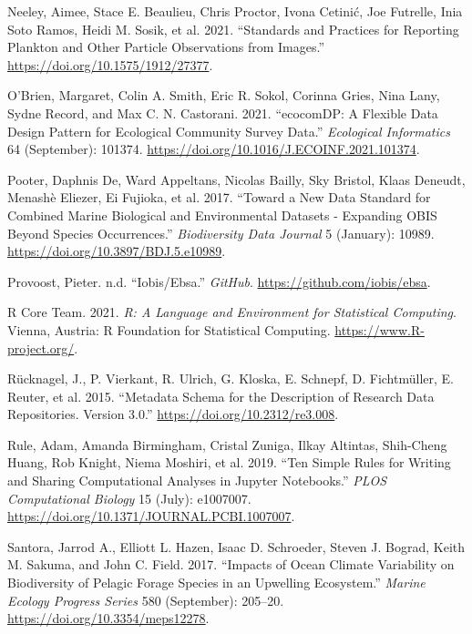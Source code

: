 \documentclass[
]{book}
\newlength{\cslhangindent}
\newlength{\cslentryspacingunit} %
\newenvironment{CSLReferences}[2] %
 {%
  \setlength{\parindent}{0pt}
  \ifodd #1
  \let\oldpar\par
  \def\par{\hangindent=\cslhangindent\oldpar}
  \fi
  \setlength{\parskip}{#2\cslentryspacingunit}
 }%
 {}
\begin{document}
\begin{CSLReferences}{1}{0}
\leavevmode{}%
Neeley, Aimee, Stace E. Beaulieu, Chris Proctor, Ivona Cetinić, Joe Futrelle, Inia Soto Ramos, Heidi M. Sosik, et al. 2021. {``Standards and Practices for Reporting Plankton and Other Particle Observations from Images.''} \url{https://doi.org/10.1575/1912/27377}.

\leavevmode{}%
O'Brien, Margaret, Colin A. Smith, Eric R. Sokol, Corinna Gries, Nina Lany, Sydne Record, and Max C. N. Castorani. 2021. {``ecocomDP: A Flexible Data Design Pattern for Ecological Community Survey Data.''} \emph{Ecological Informatics} 64 (September): 101374. \url{https://doi.org/10.1016/J.ECOINF.2021.101374}.

\leavevmode{}%
Pooter, Daphnis De, Ward Appeltans, Nicolas Bailly, Sky Bristol, Klaas Deneudt, Menashè Eliezer, Ei Fujioka, et al. 2017. {``Toward a New Data Standard for Combined Marine Biological and Environmental Datasets - Expanding OBIS Beyond Species Occurrences.''} \emph{Biodiversity Data Journal} 5 (January): 10989. \url{https://doi.org/10.3897/BDJ.5.e10989}.

\leavevmode{}%
Provoost, Pieter. n.d. {``Iobis/Ebsa.''} \emph{GitHub}. \url{https://github.com/iobis/ebsa}.

\leavevmode{}%
R Core Team. 2021. \emph{R: A Language and Environment for Statistical Computing}. Vienna, Austria: R Foundation for Statistical Computing. \url{https://www.R-project.org/}.

\leavevmode{}%
Rücknagel, J., P. Vierkant, R. Ulrich, G. Kloska, E. Schnepf, D. Fichtmüller, E. Reuter, et al. 2015. {``Metadata Schema for the Description of Research Data Repositories. Version 3.0.''} \url{https://doi.org/10.2312/re3.008}.

\leavevmode{}%
Rule, Adam, Amanda Birmingham, Cristal Zuniga, Ilkay Altintas, Shih-Cheng Huang, Rob Knight, Niema Moshiri, et al. 2019. {``Ten Simple Rules for Writing and Sharing Computational Analyses in Jupyter Notebooks.''} \emph{PLOS Computational Biology} 15 (July): e1007007. \url{https://doi.org/10.1371/JOURNAL.PCBI.1007007}.

\leavevmode{}%
Santora, Jarrod A., Elliott L. Hazen, Isaac D. Schroeder, Steven J. Bograd, Keith M. Sakuma, and John C. Field. 2017. {``Impacts of Ocean Climate Variability on Biodiversity of Pelagic Forage Species in an Upwelling Ecosystem.''} \emph{Marine Ecology Progress Series} 580 (September): 205--20. \url{https://doi.org/10.3354/meps12278}.


\end{CSLReferences}
\end{document}
